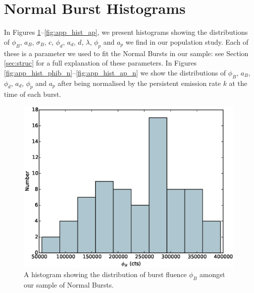 \section{Normal Burst Histograms}
\label{app:hists}

\par In Figures \ref{fig:app_hist_phib}--\ref{fig:app_hist_ap}, we present histograms showing the distributions of $\phi_B$, $a_B$, $\sigma_B$, $c$, $\phi_d$, $a_d$, $d$, $\lambda$, $\phi_p$ and $a_p$ we find in our population study.  Each of these is a parameter we used to fit the Normal Bursts in our sample: see Section \ref{sec:struc} for a full explanation of these parameters.  In Figures \ref{fig:app_hist_phib_n}--\ref{fig:app_hist_ap_n} we show the distributions of $\phi_B$, $a_B$, $\phi_d$, $a_d$, $\phi_p$ and $a_p$ after being normalised by the persistent emission rate $k$ at the time of each burst.

\begin{figure}
  \centering
  \includegraphics[width=.9\linewidth, trim={0cm 0 0cm 0},clip]{images/appendix_burst_aafluence_hist.eps}
  \caption{\small A histogram showing the distribution of burst fluence $\phi_B$ amongst our sample of Normal Bursts.}
  \label{fig:app_hist_phib}
\end{figure}

